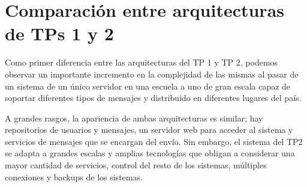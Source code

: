 \documentclass[a4paper, 10pt, twoside]{article}
\begin{document}
\section{Comparación entre arquitecturas de TPs 1 y 2}

Como primer diferencia entre las arquitecturas del TP 1 y TP 2, podemos observar un importante incremento en la complejidad de las mismas al pasar de un sistema de un único servidor en una escuela a uno de gran escala capaz de soportar diferentes tipos de mensajes y distribuido en diferentes lugares del país.

A grandes rasgos, la apariencia de ambas arquitecturas es similar; hay repositorios de usuarios y mensajes, un servidor web para acceder al sistema y servicios de mensajes que se encargan del envío. Sin embargo, el sistema del TP2 se adapta a grandes escalas y amplias tecnologías que obligan a considerar una mayor cantidad de servicios, control del resto de los sistemas, múltiples conexiones y backups de los sistemas.
\end{document}
